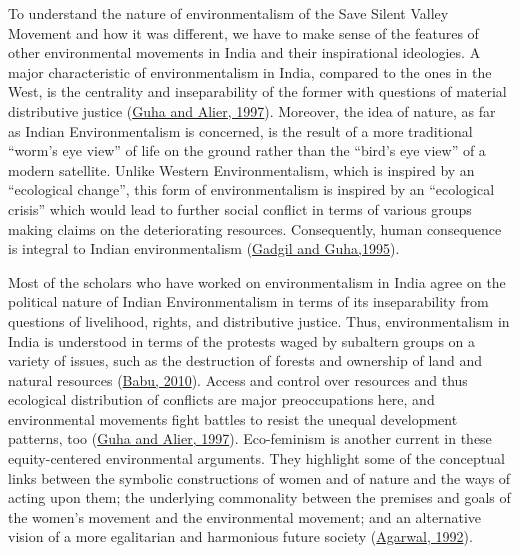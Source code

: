 \documentclass[twoside, 13pt]{article}
\begin{document}
{\fontsize{12}{14}\selectfont To understand the nature of environmentalism of the Save Silent Valley Movement and how it was different, we have to make sense of the features of other environmental movements in India and their inspirational ideologies. A major characteristic of environmentalism in India, compared to the ones in the West, is the centrality and inseparability of the former with questions of material distributive justice (\underline{Guha and Alier, 1997}). Moreover, the idea of nature, as far as Indian Environmentalism is concerned, is the result of a more traditional “worm’s eye view” of life on the ground rather than the “bird’s eye view” of a modern satellite. Unlike Western Environmentalism, which is inspired by an “ecological change”, this form of environmentalism is inspired by an “ecological crisis” which would lead to further social conflict in terms of various groups making claims on the deteriorating resources. Consequently, human consequence is integral to Indian environmentalism (\underline{Gadgil and Guha,1995}). 

Most of the scholars who have worked on environmentalism in India agree on the political nature of Indian Environmentalism in terms of its inseparability from questions of livelihood, rights, and distributive justice. Thus, environmentalism in India is understood in terms of the protests waged by subaltern groups on a variety of issues, such as the destruction of forests and ownership of land and natural resources (\underline{Babu, 2010}). Access and control over resources and thus ecological distribution of conflicts are major preoccupations here, and environmental movements fight battles to resist the unequal development patterns, too (\underline{Guha and Alier, 1997}). Eco-feminism is another current in these equity-centered environmental arguments. They highlight some of the conceptual links between the symbolic constructions of women and of nature and the ways of acting upon them; the underlying commonality between the premises and goals of the women's movement and the environmental movement; and an alternative vision of a more egalitarian and harmonious future society (\underline{Agarwal, 1992}).


}
\end{document}
